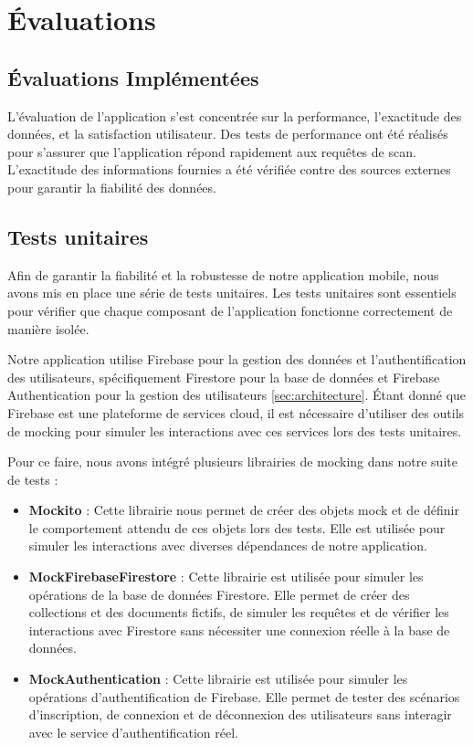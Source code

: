 \section{Évaluations}
\subsection{Évaluations Implémentées}

L'évaluation de l'application s'est concentrée sur la performance, l'exactitude des données, et la satisfaction utilisateur. Des tests de performance ont été réalisés pour s'assurer que l'application répond rapidement aux requêtes de scan. L'exactitude des informations fournies a été vérifiée contre des sources externes pour garantir la fiabilité des données.

\subsection{Tests unitaires}

Afin de garantir la fiabilité et la robustesse de notre application mobile, nous avons mis en place une série de tests unitaires. Les tests unitaires sont essentiels pour vérifier que chaque composant de l'application fonctionne correctement de manière isolée.

Notre application utilise Firebase pour la gestion des données et l'authentification des utilisateurs, spécifiquement Firestore pour la base de données et Firebase Authentication pour la gestion des utilisateurs \ref{sec:architecture}. Étant donné que Firebase est une plateforme de services cloud, il est nécessaire d'utiliser des outils de mocking pour simuler les interactions avec ces services lors des tests unitaires.

Pour ce faire, nous avons intégré plusieurs librairies de mocking dans notre suite de tests :

\begin{itemize}
    \item \textbf{Mockito} : Cette librairie nous permet de créer des objets mock et de définir le comportement attendu de ces objets lors des tests. Elle est utilisée pour simuler les interactions avec diverses dépendances de notre application.
    \item \textbf{MockFirebaseFirestore} : Cette librairie est utilisée pour simuler les opérations de la base de données Firestore. Elle permet de créer des collections et des documents fictifs, de simuler les requêtes et de vérifier les interactions avec Firestore sans nécessiter une connexion réelle à la base de données.
    \item \textbf{MockAuthentication} : Cette librairie est utilisée pour simuler les opérations d'authentification de Firebase. Elle permet de tester des scénarios d'inscription, de connexion et de déconnexion des utilisateurs sans interagir avec le service d'authentification réel.
\end{itemize}

